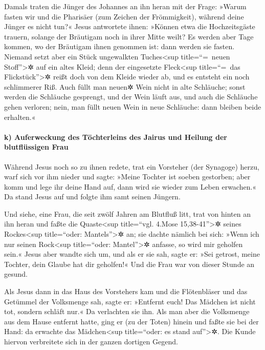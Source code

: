  Damals traten die Jünger des Johannes an ihn heran mit
der Frage: »Warum fasten wir und die Pharisäer (zum Zeichen der
Frömmigkeit), während deine Jünger es nicht tun?«  Jesus
antwortete ihnen: »Können etwa die Hochzeitsgäste trauern, solange der
Bräutigam noch in ihrer Mitte weilt? Es werden aber Tage kommen, wo der
Bräutigam ihnen genommen ist: dann werden sie fasten. 
Niemand setzt aber ein Stück ungewalkten Tuches\textless sup
title=``=~neuen Stoff''\textgreater✲ auf ein altes Kleid; denn der
eingesetzte Fleck\textless sup title=``=~das Flickstück''\textgreater✲
reißt doch von dem Kleide wieder ab, und es entsteht ein noch
schlimmerer Riß.  Auch füllt man neuen✲ Wein nicht in
alte Schläuche; sonst werden die Schläuche gesprengt, und der Wein läuft
aus, und auch die Schläuche gehen verloren; nein, man füllt neuen Wein
in neue Schläuche: dann bleiben beide erhalten.«

\hypertarget{k-auferweckung-des-tuxf6chterleins-des-jairus-und-heilung-der-blutfluxfcssigen-frau}{%
\paragraph{k) Auferweckung des Töchterleins des Jairus und Heilung der
blutflüssigen
Frau}\label{k-auferweckung-des-tuxf6chterleins-des-jairus-und-heilung-der-blutfluxfcssigen-frau}}

 Während Jesus noch so zu ihnen redete, trat ein
Vorsteher (der Synagoge) herzu, warf sich vor ihm nieder und sagte:
»Meine Tochter ist soeben gestorben; aber komm und lege ihr deine Hand
auf, dann wird sie wieder zum Leben erwachen.«  Da stand
Jesus auf und folgte ihm samt seinen Jüngern.

 Und siehe, eine Frau, die seit zwölf Jahren am Blutfluß
litt, trat von hinten an ihn heran und faßte die Quaste\textless sup
title=``vgl. 4.Mose 15,38-41''\textgreater✲ seines Rockes\textless sup
title=``oder: Mantels''\textgreater✲ an;  sie dachte
nämlich bei sich: »Wenn ich nur seinen Rock\textless sup title=``oder:
Mantel''\textgreater✲ anfasse, so wird mir geholfen sein.«
 Jesus aber wandte sich um, und als er sie sah, sagte er:
»Sei getrost, meine Tochter, dein Glaube hat dir geholfen!« Und die Frau
war von dieser Stunde an gesund.

 Als Jesus dann in das Haus des Vorstehers kam und die
Flötenbläser und das Getümmel der Volksmenge sah,  sagte
er: »Entfernt euch! Das Mädchen ist nicht tot, sondern schläft nur.« Da
verlachten sie ihn.  Als man aber die Volksmenge aus dem
Hause entfernt hatte, ging er (zu der Toten) hinein und faßte sie bei
der Hand: da erwachte das Mädchen\textless sup title=``oder: es stand
auf''\textgreater✲.  Die Kunde hiervon verbreitete sich
in der ganzen dortigen Gegend.

